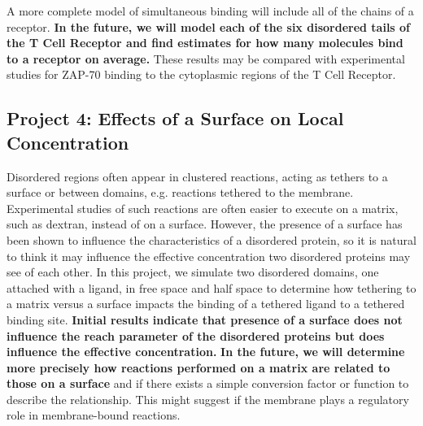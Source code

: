 \documentclass[onecolumn]{article}
\begin{document}
A more complete model of simultaneous binding will include all of the chains of a receptor. \textbf{In the future, we will model each of the six disordered tails of the T Cell Receptor and find estimates for how many molecules bind to a receptor on average.} These results may be compared with experimental studies for ZAP-70 binding to the cytoplasmic regions of the T Cell Receptor.

\subsection*{Project 4: Effects of a Surface on Local Concentration}

Disordered regions often appear in clustered reactions, acting as tethers to a surface or between domains, e.g. reactions tethered to the membrane. Experimental studies of such reactions are often easier to execute on a matrix, such as dextran, instead of on a surface. However, the presence of a surface has been shown to influence the characteristics of a disordered protein, so it is natural to think it may influence the effective concentration two disordered proteins may see of each other. In this project, we simulate two disordered domains, one attached with a ligand, in free space and half space to determine how tethering to a matrix versus a surface impacts the binding of a tethered ligand to a tethered binding site. \textbf{Initial results indicate that presence of a surface does not influence the reach parameter of the disordered proteins but does influence the effective concentration.} \textbf{In the future, we will determine more precisely how reactions performed on a matrix are related to those on a surface} and if there exists a simple conversion factor or function to describe the relationship. This might suggest if the membrane plays a regulatory role in membrane-bound reactions.






\end{document}
